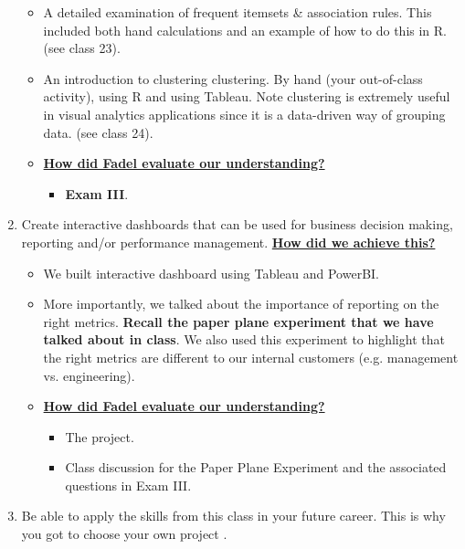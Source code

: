 \documentclass[letterpaper,12pt]{article}
\begin{document}
\begin{enumerate}[label=(\Alph*)]
\begin{itemize}[nosep]
		\item A detailed examination of frequent itemsets \& association rules. This included both hand calculations and an example of how to do this in R. (see class 23).
		\item An introduction to clustering clustering. By hand (your out-of-class activity), using R and using Tableau. Note clustering is extremely useful in visual analytics applications since it is a data-driven way of grouping data. (see class 24).
		\item \textbf{\ul{How did Fadel evaluate our understanding?}}
		\begin{itemize}[nosep]
			\item \textbf{Exam III}.
		\end{itemize}
	\end{itemize}
	\item Create interactive dashboards that can be used for business decision making, reporting and/or performance management.  \textbf{\ul{How did we achieve this?}}
	\begin{itemize}[nosep]
		\item We built interactive dashboard using Tableau and PowerBI. 
		\item More importantly, we talked about the importance of reporting on the right metrics. \textbf{Recall the paper plane experiment that we have talked about in class}. We also used this experiment to highlight that the right metrics are different to our internal customers (e.g. management vs. engineering).
		\item \textbf{\ul{How did Fadel evaluate our understanding?}}
		\begin{itemize}[nosep]
			\item The project.
			\item Class discussion for the Paper Plane Experiment and the associated questions in Exam III.
		\end{itemize}
	\end{itemize}
	\item Be able to apply the skills from this class in your future career. This is why you got to choose your own project \smiley{}.
	
\end{enumerate}
\end{document}
